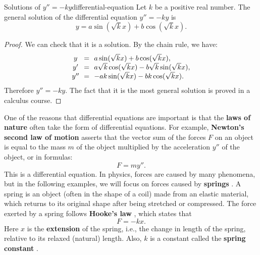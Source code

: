 \begin{theorem}{Solutions of $y''=-ky$}{differential-equation}
  Let $k$ be a positive real number.  The general solution of the
  differential equation $y'' = -ky$ is
  \begin{equation*}
    y = a\sin(\sqrt{k}x) + b\cos(\sqrt{k}x).
  \end{equation*}
\end{theorem}

\begin{proof}
  We can check that it is a solution. By the chain rule, we have:
  \begin{equation*}
    \begin{array}{c@{~~}c@{~~}l}
      y &=& a\sin(\sqrt{k}x) + b\cos(\sqrt{k}x), \\
      y' &=& a\sqrt{k}\cos(\sqrt{k}x) - b\sqrt{k}\sin(\sqrt{k}x), \\
      y'' &=& -ak\sin(\sqrt{k}x) - bk\cos(\sqrt{k}x). \\
    \end{array}
  \end{equation*}
  Therefore $y''=-ky$. The fact that it is the most general solution
  is proved in a calculus course.
\end{proof}

One of the reasons that differential equations are important is that
the \textbf{laws of nature}%
 often take the form of differential equations.
For example, \textbf{Newton's second law of motion} asserts that the
vector sum of the forces $F$ on an object is equal to the mass $m$ of
the object multiplied by the acceleration $y''$ of the object, or in
formulas:
\begin{equation*}
  F = my''.
\end{equation*}
This is a differential equation. In physics, forces are caused by many
phenomena, but in the following examples, we will focus on forces
caused by \textbf{springs}%
. A spring is an object (often in the shape
of a coil) made from an elastic material, which returns to its
original shape after being stretched or compressed. The force exerted
by a spring follows \textbf{Hooke's law}%
%
, which states that
\begin{equation*}
  F = -k x.
\end{equation*}
Here $x$ is the \textbf{extension}%
 of the spring, i.e., the change
in length of the spring, relative to its relaxed (natural)
length. Also, $k$ is a constant called the \textbf{spring constant}%
.

